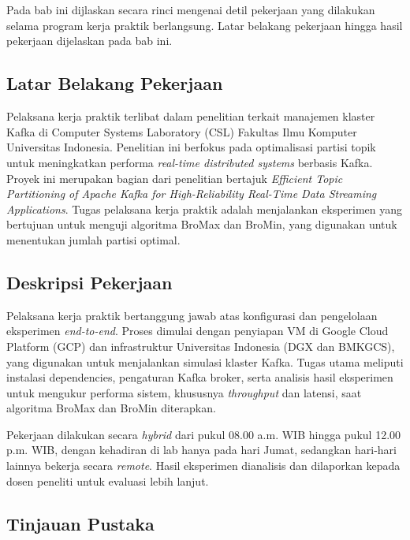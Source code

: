 \chapter{\babDua}
\label{bab:2}
Pada bab ini dijlaskan secara rinci mengenai detil pekerjaan yang dilakukan selama program kerja praktik berlangsung. Latar belakang pekerjaan hingga hasil pekerjaan dijelaskan pada bab ini.

\section{Latar Belakang Pekerjaan}
\label{sec:latar-belakang}

Pelaksana kerja praktik terlibat dalam penelitian terkait manajemen klaster Kafka di Computer Systems Laboratory (CSL) Fakultas Ilmu Komputer Universitas Indonesia. Penelitian ini berfokus pada optimalisasi partisi topik untuk meningkatkan performa \textit{real-time distributed systems} berbasis Kafka. Proyek ini merupakan bagian dari penelitian bertajuk \textit{Efficient Topic Partitioning of Apache Kafka for High-Reliability Real-Time Data Streaming Applications}. Tugas pelaksana kerja praktik adalah menjalankan eksperimen yang bertujuan untuk menguji algoritma BroMax dan BroMin, yang digunakan untuk menentukan jumlah partisi optimal.

\section{Deskripsi Pekerjaan}
\label{sec:deskripsi-pekerjaan}

Pelaksana kerja praktik bertanggung jawab atas konfigurasi dan pengelolaan eksperimen \textit{end-to-end}. Proses dimulai dengan penyiapan VM di Google Cloud Platform (GCP) dan infrastruktur Universitas Indonesia (DGX dan BMKGCS), yang digunakan untuk menjalankan simulasi klaster Kafka. Tugas utama meliputi instalasi dependencies, pengaturan Kafka broker, serta analisis hasil eksperimen untuk mengukur performa sistem, khususnya \textit{throughput} dan latensi, saat algoritma BroMax dan BroMin diterapkan.

Pekerjaan dilakukan secara \textit{hybrid} dari pukul 08.00 a.m. WIB hingga pukul 12.00 p.m. WIB, dengan kehadiran di lab hanya pada hari Jumat, sedangkan hari-hari lainnya bekerja secara \textit{remote}. Hasil eksperimen dianalisis dan dilaporkan kepada dosen peneliti untuk evaluasi lebih lanjut.

\section{Tinjauan Pustaka}
\label{sec:tinjauan-pustaka}

